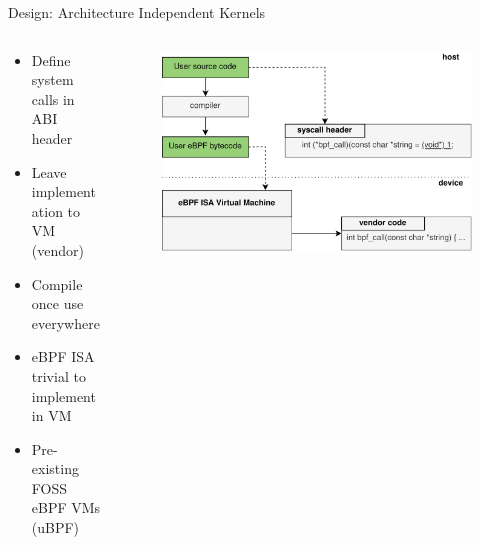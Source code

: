 \documentclass[aspectratio=169, notes]{beamer}
\begin{document}

\begin{frame}{Design: Architecture Independent Kernels}
    \begin{columns}
        \begin{column}{0.45\textwidth}
            \footnotesize
            \begin{itemize}
                \item Define system calls in ABI header
                \item Leave implementation to VM (vendor)
                \item Compile once use everywhere
                \item eBPF ISA trivial to implement in VM
                \item Pre-existing FOSS eBPF VMs (uBPF)
            \end{itemize}
        \end{column}
        \begin{column}{0.55\textwidth}
            \begingroup
            \begin{figure}
                \centering
                \includegraphics[width=1\textwidth]{resources/images/ubpf-medium-design.png}
            \end{figure}
            \endgroup
        \end{column}
    \end{columns}
\end{frame}
\end{document}

